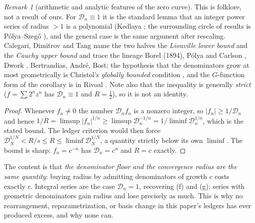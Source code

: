 \documentclass[11pt]{article}
\theoremstyle{plain}
\theoremstyle{definition}
\theoremstyle{remark}
\newtheorem{remark}[theorem]{Remark}
\begin{document}
\begin{remark}[arithmetic and analytic features of the zero curve]
\noindent This is folklore, not a result of ours. For $\mathcal D_n\equiv1$ it is the standard lemma
that an integer power series of radius $>1$ is a polynomial (Kedlaya \cite[Lem.~11.1.2]{Kedlaya};
the surrounding circle of results is P\'olya--Szeg\H{o} \cite[Part~Eight, Ch.~3]{PolyaSzego}), and
the general case is the same argument after rescaling. Calegari, Dimitrov and Tang
\cite[Lem.~1.1.2]{CDT} name the two halves the \emph{Liouville lower bound} and the \emph{Cauchy
upper bound} and trace the lineage Borel (1894), P\'olya \cite{Polya1916} and Carlson
\cite{Carlson1921}, Dwork \cite{Dwork1960}, Bertrandias, Andr\'e, Bost; the hypothesis that the
denominators grow at most geometrically is Christol's \emph{globally bounded} condition
\cite{Christol1990}, and the $G$-function form of the corollary is in Rivoal
\cite[\S3]{Rivoal2019}. Note also that the inequality is generally \emph{strict}
($f=\sum2^nz^n$ has $\mathcal D_n\equiv1$ and $R=\tfrac12$), so it is not an identity.

\begin{proof}
Whenever $f_n\ne0$ the number $\mathcal D_nf_n$ is a nonzero integer, so $|f_n|\ge1/\mathcal D_n$
and hence
$1/R=\limsup|f_n|^{1/n}\ge\limsup\mathcal D_n^{-1/n}=1/\liminf\mathcal D_n^{1/n}$, which is the
stated bound. The ledger criterion would then force
$\mathcal D_N^{1/N}<R/s\le R\le\liminf\mathcal D_N^{1/N}$, a quantity strictly below its own
$\liminf$. The bound is sharp: $f_n=c^{-n}$ has $\mathcal D_n=c^n$ and $R=c$ exactly.
\end{proof}

The content is that \emph{the denominator floor and the convergence radius are the same quantity}:
buying radius by admitting denominators of growth $c$ costs exactly $c$. Integral series are the
case $\mathcal D_n=1$, recovering (f) and (g); series with geometric denominators gain radius and
lose precisely as much. This is why no rearrangement, reparametrization, or basis change in this
paper's ledgers has ever produced excess, and why none can.


\end{remark}
\end{document}
